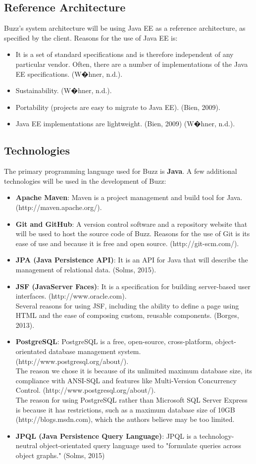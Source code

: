 \documentclass[a4paper,12pt]{report}
\begin{document}
		\subsection{Reference Architecture}
			Buzz's system architecture will be using Java EE as a reference architecture, as specified by the client. Reasons for the use of Java EE is:
			\begin{itemize}
				\item It is a set of standard specifications and is  therefore independent of any particular vendor. Often, there are a number of implementations of the Java EE specifications. (W�hner, n.d.).
				\item Sustainability. (W�hner, n.d.).
				\item Portability (projects are easy to migrate to Java EE). (Bien, 2009).
				\item Java EE implementations are lightweight. (Bien, 2009) (W�hner, n.d.).
			\end{itemize}
		\subsection{Technologies}
			The primary programming language used for Buzz is \textbf{Java}.
			A few additional technologies will be used in the development of Buzz:
			\begin{itemize}
				\item \textbf{Apache Maven}: Maven is a project management and build tool for Java. (http://maven.apache.org/).
				\item \textbf{Git and GitHub}: A version control software and a repository website that will be used to host the source code of Buzz. Reasons for the use of Git is its ease of use and because it is free and open source. (http://git-scm.com/).
				\item \textbf{JPA (Java Persistence API)}: It is an API for Java that will describe the management of relational data. (Solms, 2015).
				\item \textbf{JSF (JavaServer Faces)}: It is a specification for building server-based user interfaces. (http://www.oracle.com).\\ Several reasons for using JSF, including the ability to define a page using HTML and the ease of composing custom, reusable components. (Borges, 2013).
				\item \textbf{PostgreSQL}: PostgreSQL is a free, open-source, cross-platform, object-orientated database management system. (http://www.postgresql.org/about/).\\
				The reason we chose it is because of its unlimited maximum database size, its compliance with ANSI-SQL and features like Multi-Version Concurrency Control. (http://www.postgresql.org/about/).\\
				The reason for using PostgreSQL rather than Microsoft SQL Server Express is because it has restrictions, such as a maximum database size of 10GB (http://blogs.msdn.com), which the authors believe may be too limited.
				\item \textbf{JPQL (Java Persistence Query Language)}: JPQL is a technology-neutral object-orientated query language used to "formulate queries across object graphs." (Solms, 2015)
			\end{itemize}
\end{document}
